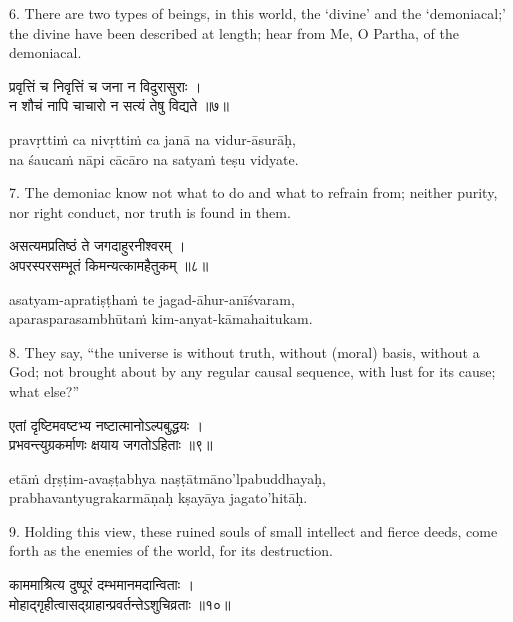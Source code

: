 6. There are two types of beings, in this world, the `divine' and the
`demoniacal;' the divine have been described at length; hear from Me, O Partha,
of the demoniacal.

\begin{gitaverse}
प्रवृत्तिं च निवृत्तिं च जना न विदुरासुराः । \\
न शौचं नापि चाचारो न सत्यं तेषु विद्यते ॥७॥
\end{gitaverse}

\begin{transliteration}
pravṛttiṁ ca nivṛttiṁ ca janā na vidur-āsurāḥ, \\
na śaucaṁ nāpi cācāro na satyaṁ teṣu vidyate.
\end{transliteration}

7. The demoniac know not what to do and what to refrain from; neither purity,
nor right conduct, nor truth is found in them.

\begin{gitaverse}
असत्यमप्रतिष्ठं ते जगदाहुरनीश्वरम् । \\
अपरस्परसम्भूतं किमन्यत्कामहैतुकम् ॥८॥
\end{gitaverse}

\begin{transliteration}
asatyam-apratiṣṭhaṁ te jagad-āhur-anīśvaram, \\
aparasparasambhūtaṁ kim-anyat-kāmahaitukam.
\end{transliteration}

8. They say, ``the universe is without truth, without (moral) basis, without a
God; not brought about by any regular causal sequence, with lust for its cause;
what else?''

\begin{gitaverse}
एतां दृष्टिमवष्टभ्य नष्टात्मानोऽल्पबुद्धयः । \\
प्रभवन्त्युग्रकर्माणः क्षयाय जगतोऽहिताः ॥९॥
\end{gitaverse}

\begin{transliteration}
etāṁ dṛṣṭim-avaṣṭabhya naṣṭātmāno'lpabuddhayaḥ, \\
prabhavantyugrakarmāṇaḥ kṣayāya jagato'hitāḥ.
\end{transliteration}

9. Holding this view, these ruined souls of small intellect and fierce deeds,
come forth as the enemies of the world, for its destruction.

\begin{gitaverse}
काममाश्रित्य दुष्पूरं दम्भमानमदान्विताः । \\
मोहाद्गृहीत्वासद्ग्राहान्प्रवर्तन्तेऽशुचिव्रताः ॥१०॥
\end{gitaverse}

